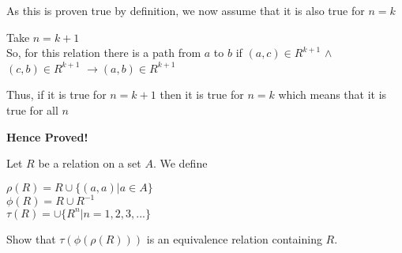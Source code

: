 \documentclass[addpoints]{exam}
\begin{document}
\begin{questions}
\begin{solution}
    As this is proven true by definition, we now assume that it is also true for $n = k$
    
    Take $n = k+1$
\\So, for this relation there is a path from $a$ to $b$ if $(a,c) \in R^{k+1} $ $\wedge$ $(c,b) \in R^{k+1} $ $\rightarrow (a,b) \in R^{k+1}$ 


Thus, if it is true for $n = k+1$ then it is true for $n= k$ which means that it is true for all $n$

\textbf{Hence Proved!}
    
    
  \end{solution}

\question
    Let $R$ be a relation on a set $A$. We define

    $\rho (R) = R \cup \{(a, a) | a \in A\}$ \\ 
    $\phi (R) = R \cup R^{-1}$ \\
    $\tau (R) = \cup \{ R^n | n = 1,2,3,...\}$
    
    Show that $\tau (\phi (\rho (R)))$ is an equivalence relation containing $R$.
    
      \begin{solution}
    
  \end{solution}


\end{questions}
\end{document}
